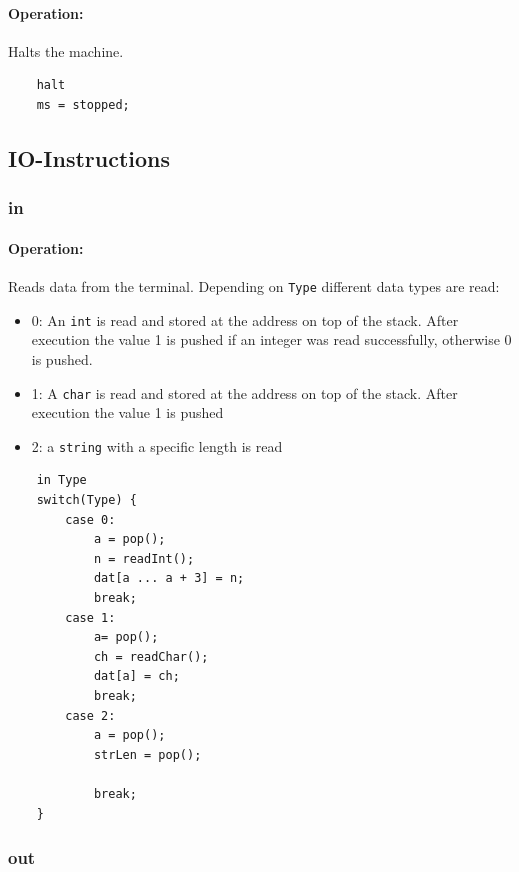 \paragraph{Operation:}
Halts the machine.

	\begin{lstlisting}
	halt
	ms = stopped;
	\end{lstlisting}
	

\subsection{IO-Instructions}

\subsubsection{in}\label{sec:in}

\paragraph{Operation:}
Reads data from the terminal. Depending on \lstinline$Type$ different data types are read:

\begin{itemize}
	\item 0: An \lstinline$int$ is read and stored at the address on top of the stack. After execution the value 1 is pushed if an integer was read successfully, otherwise 0 is pushed.
	\item 1: A \lstinline$char$ is read and stored at the address on top of the stack. After execution the value 1 is pushed 
	\item 2: a \lstinline$string$ with a specific length is read
\end{itemize}

	\begin{lstlisting}
	in Type
	switch(Type) {
		case 0:
			a = pop();
			n = readInt();
			dat[a ... a + 3] = n;
			break;
		case 1:
			a= pop();
			ch = readChar();
			dat[a] = ch;
			break;
		case 2:
			a = pop();
			strLen = pop();
			
			break;
	}
	\end{lstlisting}

\subsubsection{out}\label{sec:out}

